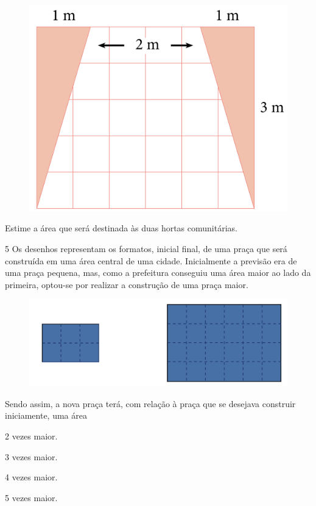 \begin{figure}[htpb!]
\centering
\includegraphics[width=.5\textwidth]{../ilustracoes/MAT5/SAEB_5ANO_MAT_figura38.png}
\end{figure}

Estime a área que será destinada às duas hortas comunitárias.


\bigskip
\bigskip

\num{5} Os desenhos representam os formatos, inicial  final, de uma praça que será construída em uma
área central de uma cidade. Inicialmente a previsão era de uma praça
pequena, mas, como a prefeitura conseguiu uma área maior ao lado da
primeira, optou-se por realizar a construção de uma praça maior.

\begin{figure}[htpb!]
\centering
\includegraphics[width=.5\textwidth]{../ilustracoes/MAT5/SAEB_5ANO_MAT_figura39.png}
\end{figure}

Sendo assim, a nova praça terá, com relação à praça que se
desejava construir iniciamente, uma área

\begin{minipage}{.5\textwidth}
\begin{escolha}
\item
  2 vezes maior.
\item
  3 vezes maior.
\item
  4 vezes maior.
\item
  5 vezes maior.
\end{escolha}
\end{minipage}

